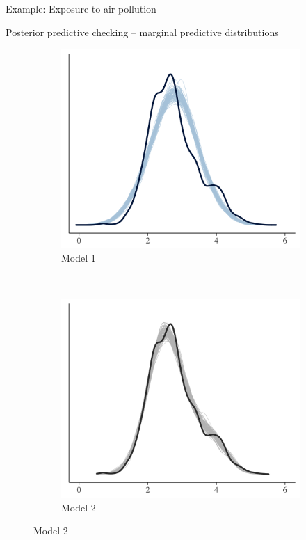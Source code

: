 \documentclass[t]{beamer}
\begin{document}
\begin{frame}{Example: Exposure to air pollution}

  Posterior predictive checking -- marginal predictive distributions
\begin{figure}
\centering
\begin{subfigure}{0.48\textwidth}
\includegraphics[width=\textwidth]{ppc_dens1.png}
\caption{Model 1}
\end{subfigure}
~
\begin{subfigure}{0.48\textwidth}
\includegraphics[width=\textwidth]{ppc_dens2.png}
\caption{Model 2}
\end{subfigure}
\end{figure}

\end{frame}
\end{document}
